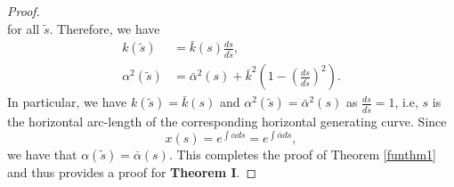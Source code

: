 \documentclass[10pt,a4paper]{amsart}
\begin{document}
\begin{proof}
\begin{equation}
\end{equation}
for all $\tilde{s}$.
Therefore, we have
\begin{equation}
\begin{split}
k(\tilde{s})&=\bar k(s)\frac{ds}{d\tilde{s}},\\
\alpha^2(\tilde{s})&=\bar\alpha^2(s)+\bar k^{2}\left(1-(\frac{ds}{d\tilde{s}})^2\right).
\end{split}
\end{equation}
In particular, we have $k(\tilde{s})=\bar k(s)$ and $\alpha^2(\tilde{s})=\bar\alpha^2(s)$ as $\frac{ds}{d\tilde{s}}=1$, i.e, $s$ is the horizontal arc-length of the corresponding horizontal generating curve. Since \[x(s)=e^{\int \alpha ds}=e^{\int\bar\alpha ds},\] we have that $\alpha(\tilde{s})=\bar\alpha(s)$. This completes the proof of Theorem \ref{funthm1} and thus provides a proof for {\bf Theorem I}.
\end{proof}
\end{document}
